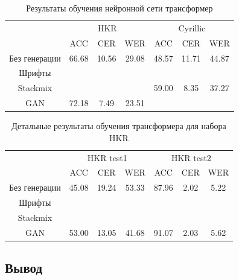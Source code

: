 \begin{table}[h!]
    \centering
    \begin{tabular}{|c|c|c|c|c|c|c|}
        \hline
              & \multicolumn{3}{c|}{HKR} & \multicolumn{3}{c|}{Cyrillic} \\
        \cline{2-7}
                         &  ACC  &  CER  &  WER  &  ACC  &  CER  &  WER  \\
        \hline
        \hline
        Без генерации    & 66.68 & 10.56 & 29.08 & 48.57 & 11.71 & 44.87 \\
        Шрифты           &       &       &       &       &       &       \\
        Stackmix         &       &       &       & 59.00 & 8.35  & 37.27 \\
        GAN              & 72.18 & 7.49  & 23.51 &       &       &       \\
        \hline
    \end{tabular}
    \caption{Результаты обучения нейронной сети трансформер}
    \label{tab:transformer_htr_results}
\end{table}

\begin{table}[h!]
    \centering
    \begin{tabular}{|c|c|c|c|c|c|c|}
        \hline
        & \multicolumn{3}{c|}{HKR test1} & \multicolumn{3}{c|}{HKR test2} \\
        \cline{2-7}
                         &  ACC  &  CER  &  WER  &  ACC  &  CER  &  WER  \\
        \hline
        \hline
        Без генерации    & 45.08 & 19.24 & 53.33 & 87.96 & 2.02  & 5.22  \\
        Шрифты           &       &       &       &       &       &       \\
        Stackmix         &       &       &       &       &       &       \\
        GAN              & 53.00 & 13.05 & 41.68 & 91.07 & 2.03  & 5.62  \\
        \hline
    \end{tabular}
    \caption{Детальные результаты обучения трансформера для набора HKR}
    \label{tab:transformer_htr_results_hkr}
\end{table}


\subsection{Вывод}
\label{subsec:experiment_conclusion}

